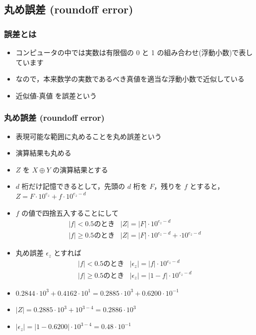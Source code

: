 \subsection{丸め誤差 (roundoff error)}
\begin{frame}[shrink]
\frametitle{誤差とは}
  \begin{itemize}
\item コンピュータの中では実数は有限個の 0 と 1 の組み合わせ(浮動小数)で表しています
\item なので，本来数学の実数であるべき真値を適当な浮動小数で近似している
\item 近似値-真値 を誤差という
  \end{itemize}
\end{frame}
\begin{frame}[shrink]
\frametitle{丸め誤差 (roundoff error)}
  \begin{itemize}
\item 表現可能な範囲に丸めることを丸め誤差という
\item 演算結果も丸める
\item $Z$ を \(X\oplus Y\) の演算結果とする
\item $d$ 桁だけ記憶できるとして，先頭の $d$ 桁を $F$，残りを $f$ とすると，\(Z=F\cdot 10^{e_z}+f\cdot 10^{e_z-d}\)
\item $f$ の値で四捨五入することにして
    \begin{displaymath}
      \begin{array}{ll}
|f|<0.5 \mbox{のとき} & |Z|=|F|\cdot 10^{e_z-d}\\
|f|\geq 0.5 \mbox{のとき} & |Z|=|F|\cdot 10^{e_z-d}+\cdot 10^{e_z-d}
      \end{array}
    \end{displaymath}
\item 丸め誤差 $\epsilon_z$ とすれば
    \begin{displaymath}
      \begin{array}{ll}
|f|<0.5 \mbox{のとき} & |\epsilon_z|=|f|\cdot 10^{e_z-d}\\
|f|\geq 0.5 \mbox{のとき} & |\epsilon_z|=|1-f|\cdot 10^{e_z-d}
      \end{array}
    \end{displaymath}
  \end{itemize}
  \begin{example}
    \begin{itemize}
\item \(0.2844\cdot 10^3+0.4162\cdot 10^1=0.2885\cdot 10^3+0.6200\cdot 10^{-1}\)
\item \(|Z|=0.2885\cdot 10^3+10^{3-4}=0.2886\cdot 10^3\)
\item \(|\epsilon_z|=|1-0.6200|\cdot 10^{3-4}=0.48\cdot 10^{-1}\)
    \end{itemize}
  \end{example}
\end{frame}
